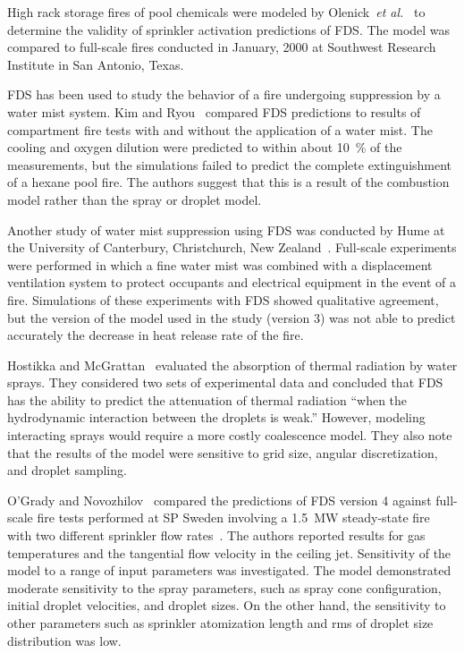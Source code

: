 High rack storage fires of pool chemicals were modeled by Olenick~{\em et al.}~\cite{Olenick:1} to determine the validity of sprinkler activation predictions of FDS. The model was compared to full-scale fires conducted in January, 2000 at Southwest Research Institute in San Antonio, Texas.

FDS has been used to study the behavior of a fire undergoing suppression by a water mist system. Kim and Ryou~\cite{Kim:BE2003,Kim:IJACR2004}  compared FDS  predictions to results of compartment fire tests with and without the application of a water mist. The cooling and oxygen dilution were predicted to within about 10~\% of the measurements, but the simulations failed to predict the complete extinguishment of a hexane pool fire. The authors suggest that this is a result of the combustion model rather than the spray or droplet model.

Another study of water mist suppression using FDS was conducted by Hume  at  the  University  of  Canterbury,  Christchurch,  New Zealand~\cite{Hume:Masters}. Full-scale experiments were performed in which a fine water mist was combined with a displacement ventilation system to protect occupants and electrical equipment in the event of a fire. Simulations of these experiments with FDS showed qualitative agreement, but the version of the model used in the study (version 3) was not able to predict accurately the decrease in heat release rate of the fire.

Hostikka  and  McGrattan~\cite{Hostikka:FSJ2006}  evaluated  the absorption of thermal radiation by water sprays. They considered two sets of experimental data and concluded that FDS has the ability to predict the attenuation of thermal radiation ``when the hydrodynamic interaction between  the droplets is  weak.'' However, modeling interacting sprays would require a more costly coalescence model. They also note that the results of the model were sensitive to grid size, angular discretization, and droplet sampling.

O'Grady and Novozhilov~\cite{OGrady:CST} compared the predictions of FDS version 4 against full-scale fire tests performed at SP Sweden involving a 1.5~MW steady-state fire with two different sprinkler flow rates~\cite{Ingason:1}. The authors reported results for gas temperatures and the tangential flow velocity in the ceiling jet. Sensitivity of the model to a range of input parameters was investigated. The model demonstrated moderate sensitivity to the spray parameters, such as spray cone configuration, initial droplet velocities, and droplet sizes. On the other hand, the sensitivity to other parameters such as sprinkler atomization length and rms of droplet size distribution was low.

